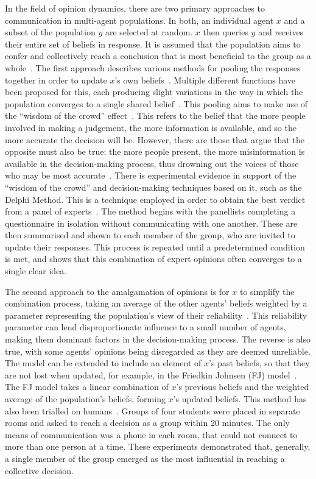 In the field of opinion dynamics, there are two primary approaches to communication in multi-agent populations. In both, an individual agent $x$ and a subset of the population $y$ are selected at random. $x$ then queries $y$ and receives their entire set of beliefs in response. It is assumed that the population aims to confer and collectively reach a conclusion that is most beneficial to the group as a whole~\cite{Rawls1971AJustice}. The first approach describes various methods for pooling the responses together in order to update $x$'s own beliefs~\cite{Degroot1974ReachingConsensus}. Multiple different functions have been proposed for this, each producing slight variations in the way in which the population converges to a single shared belief~\cite{Lee2018CombiningConsensus}. This pooling aims to make use of the ``wisdom of the crowd'' effect~\cite{Golub2010NaiveCrowds}. This refers to the belief that the more people involved in making a judgement, the more information is available, and so the more accurate the decision will be. However, there are those that argue that the opposite must also be true: the more people present, the more misinformation is available in the decision-making process, thus drowning out the voices of those who may be most accurate~\cite{Dalkey1963AnExperts}. There is experimental evidence in support of the ``wisdom of the crowd'' and decision-making techniques based on it, such as the Delphi Method. This is a technique employed in order to obtain the best verdict from a panel of experts~\cite{Dalkey1963AnExperts}. The method begins with the panellists completing a questionnaire in isolation without communicating with one another. These are then summarised and shown to each member of the group, who are invited to update their responses. This process is repeated until a predetermined condition is met, and shows that this combination of expert opinions often converges to a single clear idea. 

The second approach to the amalgamation of opinions is for $x$ to simplify the combination process, taking an average of the other agents' beliefs weighted by a parameter representing the population's view of their reliability~\cite{Hegselmann2002OpinionSimulation}. This reliability parameter can lend disproportionate influence to a small number of agents, making them dominant factors in the decision-making process. The reverse is also true, with some agents' opinions being disregarded as they are deemed unreliable. The model can be extended to include an element of $x$'s past beliefs, so that they are not lost when updated, for example, in the Friedkin Johnsen (FJ) model~\cite{Friedkin1999SocialChange}. The FJ model takes a linear combination of $x$'s previous beliefs and the weighted average of the population's beliefs, forming $x$'s updated beliefs. This method has also been trialled on humans~\cite{Friedkin2011APower}. Groups of four students were placed in separate rooms and asked to reach a decision as a group within 20 minutes. The only means of communication was a phone in each room, that could not connect to more than one person at a time. These experiments demonstrated that, generally, a single member of the group emerged as the most influential in reaching a collective decision. 


